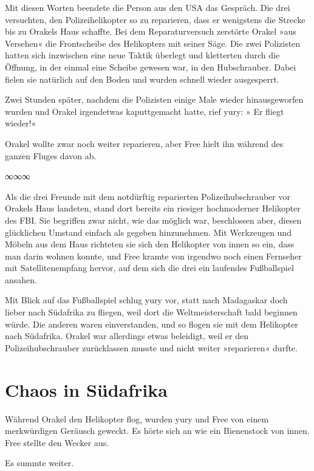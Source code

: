 Mit diesen Worten beendete die Person aus den USA das Gespräch. Die drei versuchten, den Polizeihelikopter so zu reparieren, dass er wenigstens die Strecke bis zu Orakels Haus schaffte. Bei dem Reparaturversuch zerstörte Orakel »aus Versehen« die Frontscheibe des Helikopters mit seiner Säge. Die zwei Polizisten hatten sich inzwischen eine neue Taktik überlegt und kletterten durch die Öffnung, in der einmal eine Scheibe gewesen war, in den Hubschrauber. Dabei fielen sie natürlich auf den Boden und wurden schnell wieder ausgesperrt.

Zwei Stunden später, nachdem die Polizisten einige Male wieder hinausgeworfen wurden und Orakel irgendetwas kaputtgemacht hatte, rief yury: » Er fliegt wieder!«

Orakel wollte zwar noch weiter reparieren, aber Free hielt ihn während des ganzen Fluges davon ab.

\begin{center}
    ∞∞∞
\end{center}

Als die drei Freunde mit dem notdürftig reparierten Polizeihubschrauber vor Orakels Haus landeten, stand dort bereits ein riesiger hochmoderner Helikopter des FBI. Sie begriffen zwar nicht, wie das möglich war, beschlossen aber, diesen glücklichen Umstand einfach als gegeben hinzunehmen. Mit Werkzeugen und Möbeln aus dem Haus richteten sie sich den Helikopter von innen so ein, dass man darin wohnen konnte, und Free kramte von irgendwo noch einen Fernseher mit Satellitenempfang hervor, auf dem sich die drei ein laufendes Fußballspiel ansahen.

Mit Blick auf das Fußballspiel schlug yury vor, statt nach Madagaskar doch lieber nach Südafrika zu fliegen, weil dort die Weltmeisterschaft bald beginnen würde. Die anderen waren einverstanden, und so flogen sie mit dem Helikopter nach Südafrika. Orakel war allerdings etwas beleidigt, weil er den Polizeihubschrauber zurücklassen musste und nicht weiter »reparieren« durfte.


\chapter{Chaos in Südafrika}

Während Orakel den Helikopter flog, wurden yury und Free von einem merkwürdigen Geräusch geweckt. Es hörte sich an wie ein Bienenstock von innen. Free stellte den Wecker aus.

Es summte weiter.

